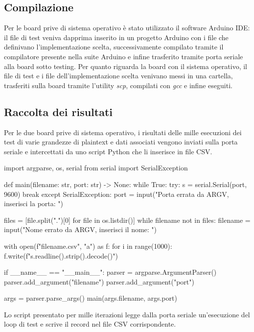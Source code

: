 \subsection{Compilazione}

Per le board prive di sistema operativo è stato utilizzato il software Arduino IDE: il file di test veniva dapprima inserito in un progetto Arduino con i file che definivano l'implementazione scelta, successivamente compilato tramite il compilatore presente nella suite Arduino e infine trasferito tramite porta seriale alla board sotto testing. Per quanto riguarda la board con il sistema operativo, il file di test e i file dell'implementazione scelta venivano messi in una cartella, trasferiti sulla board tramite l'utility \textit{scp}, compilati con \textit{gcc} e infine eseguiti.

\subsection{Raccolta dei risultati}

Per le due board prive di sistema operativo, i risultati delle mille esecuzioni dei test di varie grandezze di plaintext e dati associati vengono inviati sulla porta seriale e intercettati da uno script Python che li inserisce in file CSV.

\begin{python}
import argparse, os, serial
from serial import SerialException


def main(filename: str, port: str) -> None:
  while True:
    try:
      s = serial.Serial(port, 9600)
        break
      except SerialException:
        port = input("Porta errata da ARGV, inserisci la porta: ")

  files = [file.split(".")[0] for file in os.listdir()]
  while filename not in files:
    filename = input("Nome errato da ARGV, inserisci il nome: ")

  with open(f"{filename}.csv", "a") as f:
    for i in range(1000):
      f.write(f"{s.readline().strip().decode()}\n")


if __name__ == "__main__":
  parser = argparse.ArgumentParser()
  parser.add_argument("filename")
  parser.add_argument("port")

  args = parser.parse_args()
  main(args.filename, args.port)
\end{python}

\noindent Lo script presentato per mille iterazioni legge dalla porta seriale un'esecuzione del loop di test e scrive il record nel file CSV corrispondente. \\


